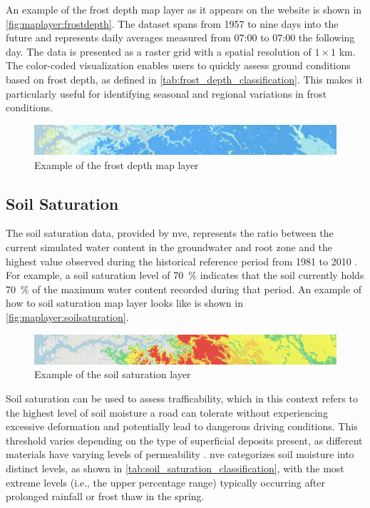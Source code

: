 An example of the frost depth map layer as it appears on the website is shown in \autoref{fig:maplayer:frostdepth}. The dataset spans from 1957 to nine days into the future and represents daily averages measured from 07:00 to 07:00 the following day. The data is presented as a raster grid with a spatial resolution of $1 \times 1$ km. The color-coded visualization enables users to quickly assess ground conditions based on frost depth, as defined in \autoref{tab:frost_depth_classification}. This makes it particularly useful for identifying seasonal and regional variations in frost conditions.

\begin{figure}[h]
    \centering
    \includegraphics[width=1\linewidth]{images/maplayers/frostdepth.png}
    \caption{Example of the frost depth map layer}
    \label{fig:maplayer:frostdepth}
\end{figure}

\subsection{Soil Saturation}\label{subsec:soilsaturation}

The soil saturation data, provided by \acrshort{nve}, represents the ratio between the current simulated water content in the groundwater and root zone and the highest value observed during the historical reference period from 1981 to 2010 \cite{nve2025waterdata}. For example, a soil saturation level of \qty{70}{\percent} indicates that the soil currently holds \qty{70}{\percent} of the maximum water content recorded during that period. An example of how to soil saturation map layer looks like is shown in \autoref{fig:maplayer:soilsaturation}.

\begin{figure}[h]
    \centering
    \includegraphics[width=1\linewidth]{images/maplayers/soilmoisture.png}
    \caption{Example of the soil saturation layer}
    \label{fig:maplayer:soilsaturation}
\end{figure}

Soil saturation can be used to assess \gls{trafficability}, which in this context refers to the highest level of soil moisture a road can tolerate without experiencing excessive deformation and potentially lead to dangerous driving conditions. This threshold varies depending on the type of superficial deposits present, as different materials have varying levels of permeability \cite{fjeld2023trafficability}. \acrshort{nve} categorizes soil moisture into distinct levels, as shown in \autoref{tab:soil_saturation_classification}, with the most extreme levels (i.e., the upper percentage range) typically occurring after prolonged rainfall or frost thaw in the spring.

